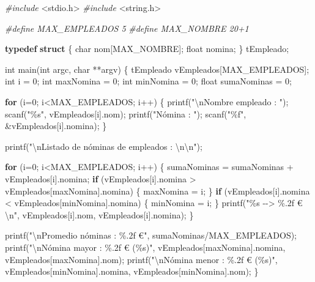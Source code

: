 \documentclass[
]{book}
\newenvironment{Shaded}{\begin{snugshade}}{\end{snugshade}}
\newcommand{\ControlFlowTok}[1]{\textcolor[rgb]{0.13,0.29,0.53}{\textbf{#1}}}
\newcommand{\DataTypeTok}[1]{\textcolor[rgb]{0.13,0.29,0.53}{#1}}
\newcommand{\DecValTok}[1]{\textcolor[rgb]{0.00,0.00,0.81}{#1}}
\newcommand{\ImportTok}[1]{#1}
\newcommand{\KeywordTok}[1]{\textcolor[rgb]{0.13,0.29,0.53}{\textbf{#1}}}
\newcommand{\NormalTok}[1]{#1}
\newcommand{\PreprocessorTok}[1]{\textcolor[rgb]{0.56,0.35,0.01}{\textit{#1}}}
\newcommand{\SpecialCharTok}[1]{\textcolor[rgb]{0.00,0.00,0.00}{#1}}
\newcommand{\StringTok}[1]{\textcolor[rgb]{0.31,0.60,0.02}{#1}}
\begin{document}
\begin{Shaded}
\begin{Highlighting}[]
\PreprocessorTok{\#include }\ImportTok{\textless{}stdio.h\textgreater{}}
\PreprocessorTok{\#include }\ImportTok{\textless{}string.h\textgreater{}}

\PreprocessorTok{\#define MAX\_EMPLEADOS 5}
\PreprocessorTok{\#define MAX\_NOMBRE 20+1}

\KeywordTok{typedef} \KeywordTok{struct}\NormalTok{ \{}
    \DataTypeTok{char}\NormalTok{ nom[MAX\_NOMBRE];}
    \DataTypeTok{float}\NormalTok{ nomina;}
\NormalTok{\} tEmpleado;}

\DataTypeTok{int}\NormalTok{ main(}\DataTypeTok{int}\NormalTok{ argc, }\DataTypeTok{char}\NormalTok{ **argv) \{}
\NormalTok{    tEmpleado vEmpleados[MAX\_EMPLEADOS];}
    \DataTypeTok{int}\NormalTok{ i = }\DecValTok{0}\NormalTok{;}
    \DataTypeTok{int}\NormalTok{ maxNomina = }\DecValTok{0}\NormalTok{;}
    \DataTypeTok{int}\NormalTok{ minNomina = }\DecValTok{0}\NormalTok{;}
    \DataTypeTok{float}\NormalTok{ sumaNominas = }\DecValTok{0}\NormalTok{;}

    \ControlFlowTok{for}\NormalTok{ (i=}\DecValTok{0}\NormalTok{; i\textless{}MAX\_EMPLEADOS; i++) \{}
\NormalTok{        printf(}\StringTok{"}\SpecialCharTok{\textbackslash{}n}\StringTok{Nombre empleado : "}\NormalTok{);}
\NormalTok{        scanf(}\StringTok{"\%s"}\NormalTok{, vEmpleados[i].nom);}
\NormalTok{        printf(}\StringTok{"Nómina : "}\NormalTok{);}
\NormalTok{        scanf(}\StringTok{"\%f"}\NormalTok{, \&vEmpleados[i].nomina);}
\NormalTok{    \}}

\NormalTok{    printf(}\StringTok{"}\SpecialCharTok{\textbackslash{}n}\StringTok{Listado de nóminas de empleados : }\SpecialCharTok{\textbackslash{}n\textbackslash{}n}\StringTok{"}\NormalTok{);}

    \ControlFlowTok{for}\NormalTok{ (i=}\DecValTok{0}\NormalTok{; i\textless{}MAX\_EMPLEADOS; i++) \{}
\NormalTok{        sumaNominas = sumaNominas + vEmpleados[i].nomina;}
        \ControlFlowTok{if}\NormalTok{ (vEmpleados[i].nomina \textgreater{} vEmpleados[maxNomina].nomina) \{}
\NormalTok{            maxNomina = i;}
\NormalTok{        \}}
        \ControlFlowTok{if}\NormalTok{ (vEmpleados[i].nomina \textless{} vEmpleados[minNomina].nomina) \{}
\NormalTok{            minNomina = i;}
\NormalTok{        \}}
\NormalTok{        printf(}\StringTok{"\%s {-}{-}\textgreater{} \%.2f €}\SpecialCharTok{\textbackslash{}n}\StringTok{"}\NormalTok{, vEmpleados[i].nom, vEmpleados[i].nomina);}
\NormalTok{    \}}

\NormalTok{    printf(}\StringTok{"}\SpecialCharTok{\textbackslash{}n}\StringTok{Promedio nóminas : \%.2f €"}\NormalTok{, sumaNominas/MAX\_EMPLEADOS);}
\NormalTok{    printf(}\StringTok{"}\SpecialCharTok{\textbackslash{}n}\StringTok{Nómina mayor : \%.2f € (\%s)"}\NormalTok{, vEmpleados[maxNomina].nomina, vEmpleados[maxNomina].nom);}
\NormalTok{    printf(}\StringTok{"}\SpecialCharTok{\textbackslash{}n}\StringTok{Nómina menor : \%.2f € (\%s)"}\NormalTok{, vEmpleados[minNomina].nomina, vEmpleados[minNomina].nom);}
\NormalTok{\}}
\end{Highlighting}
\end{Shaded}
\end{document}
